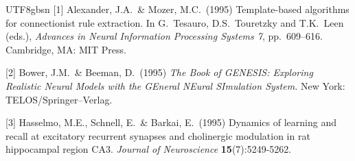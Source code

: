\documentclass{article}
\begin{document}
\begin{CJK*}{UTF8}{gbsn}
[1] Alexander, J.A.\ \& Mozer, M.C.\ (1995) Template-based algorithms for
connectionist rule extraction. In G.\ Tesauro, D.S.\ Touretzky and T.K.\ Leen
(eds.), {\it Advances in Neural Information Processing Systems 7},
pp.\ 609--616. Cambridge, MA: MIT Press.

[2] Bower, J.M.\ \& Beeman, D.\ (1995) {\it The Book of GENESIS: Exploring
  Realistic Neural Models with the GEneral NEural SImulation System.}  New York:
TELOS/Springer--Verlag.

[3] Hasselmo, M.E., Schnell, E.\ \& Barkai, E.\ (1995) Dynamics of learning and
recall at excitatory recurrent synapses and cholinergic modulation in rat
hippocampal region CA3. {\it Journal of Neuroscience} {\bf 15}(7):5249-5262.

\end{CJK*}
\end{document}
